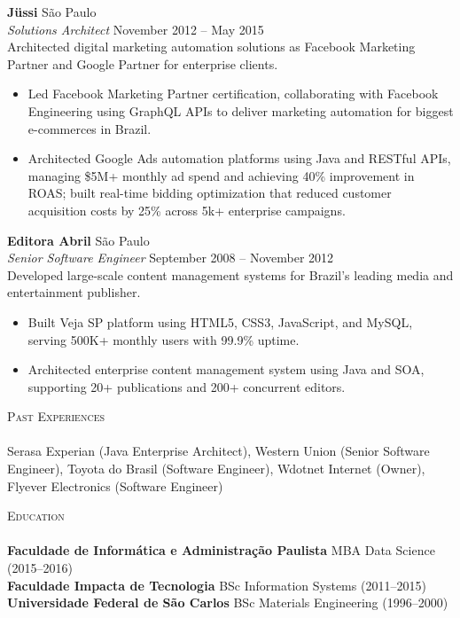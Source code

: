 \documentclass[a4paper]{article}
\newcommand{\lineunder} {
    \vspace*{-8pt} \\
    \hspace*{-18pt} \hrulefill \\
}
\newcommand{\header} [1] {
    {\hspace*{-18pt}\vspace*{6pt} \textsc{#1}}
    \vspace*{-6pt} \lineunder
}
\begin{document}
\textbf{Jüssi} \hfill São Paulo\\
\textit{Solutions Architect} \hfill November 2012 -- May 2015\\[2pt]
Architected digital marketing automation solutions as Facebook Marketing Partner and Google Partner for enterprise clients.
\vspace{1mm}
\begin{itemize}
\item Led Facebook Marketing Partner certification, collaborating with Facebook Engineering using GraphQL APIs to deliver marketing automation for biggest e-commerces in Brazil.
\item Architected Google Ads automation platforms using Java and RESTful APIs, managing \$5M+ monthly ad spend and achieving 40\% improvement in ROAS; built real-time bidding optimization that reduced customer acquisition costs by 25\% across 5k+ enterprise campaigns.
\end{itemize}
\vspace{1mm}

\textbf{Editora Abril} \hfill São Paulo\\
\textit{Senior Software Engineer} \hfill September 2008 -- November 2012\\[2pt]
Developed large-scale content management systems for Brazil's leading media and entertainment publisher.
\vspace{-1mm}
\begin{itemize}
\item Built Veja SP platform using HTML5, CSS3, JavaScript, and MySQL, serving 500K+ monthly users with 99.9\% uptime.
\item Architected enterprise content management system using Java and SOA, supporting 20+ publications and 200+ concurrent editors.
\end{itemize}
\vspace{1mm}

\header{Past Experiences}
\vspace{1mm}
Serasa Experian (Java Enterprise Architect), Western Union (Senior Software Engineer), Toyota do Brasil (Software Engineer), Wdotnet Internet (Owner), Flyever Electronics (Software Engineer)\\
\vspace{1mm}

\header{Education}
\vspace{1mm}
\textbf{Faculdade de Informática e Administração Paulista} \hfill MBA Data Science (2015--2016)\\
\textbf{Faculdade Impacta de Tecnologia} \hfill BSc Information Systems (2011--2015)\\
\textbf{Universidade Federal de São Carlos} \hfill BSc Materials Engineering (1996--2000)\\
\vspace{1mm}
\end{document}
